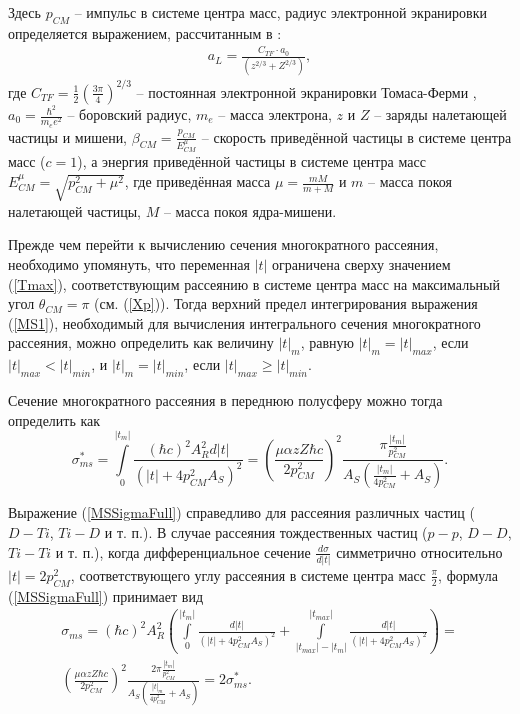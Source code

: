 \documentclass[a4paper,12pt]{article}
\begin{document}
\begin{large}
Здесь $p_{CM}$ -- импульс в системе центра масс, радиус электронной экранировки определяется выражением, рассчитанным в \cite{LinhardScreeningLength}:
\begin{equation}
\label{MSaL}
\begin{aligned} 
a_L=\frac{ C_{TF} \cdot a_0 }{ \left( z^{2/3} + Z^{2/3} \right) },
\end{aligned}
\end{equation} 
где $C_{TF}= \frac{1}{2} \left( \frac{3\pi}{4} \right)^{2/3}$ -- постоянная электронной экранировки Томаса-Ферми \cite{ThomasFermiModel}, $a_0=\frac{ \hbar^2 }{ m_ee^2 }$ -- боровский радиус, $m_e$ -- масса электрона, $z$ и $Z$ -- заряды налетающей частицы и мишени, $\beta_{CM}=\frac{p_{CM}}{E_{CM}^{\mu}}$ -- скорость приведённой частицы в системе центра масс ($c=1$), а энергия приведённой частицы в системе центра масс $E_{CM}^{\mu}=\sqrt{p_{CM}^2+\mu^2}$, где приведённая масса $\mu=\frac{mM}{m+M}$ и $m$ -- масса покоя налетающей частицы, $M$ -- масса покоя ядра-мишени.

Прежде чем перейти к вычислению сечения многократного рассеяния, необходимо упомянуть, что переменная $|t|$ ограничена сверху значением (\ref{Tmax}),
соответствующим рассеянию в системе центра масс на максимальный угол $\theta_{CM}=\pi$ (см. (\ref{Xp})). Тогда верхний предел интегрирования выражения (\ref{MS1}), необходимый для вычисления интегрального сечения многократного рассеяния, можно определить как величину $|t|_m$, равную $|t|_m=|t|_{max}$, если $|t|_{max}<|t|_{min}$, и $|t|_m=|t|_{min}$, если $|t|_{max} \geq |t|_{min}$.

Сечение многократного рассеяния в переднюю полусферу можно тогда определить как
\begin{equation}
\label{MSSigmaFull} 
\sigma^*_{ms}= \int \limits_0^{|t_{m}|} \frac{\left( \hbar c \right)^2 A_R^2 d|t|}{\left( |t| + 4p_{CM}^2 A_S \right)^2} = \left( \frac{\mu \alpha z Z \hbar c }{2p_{CM}^2} \right)^2 \frac{\pi\frac{|t_{m}|}{p_{CM}^2}}{ A_S \left( \frac{|t_{m}|}{4p_{CM}^2} + A_S \right) }.
\end{equation}

Выражение (\ref{MSSigmaFull}) справедливо для рассеяния различных частиц ($D-Ti$, $Ti-D$ и т. п.). В случае рассеяния тождественных частиц ($p-p$, $D-D$, $Ti-Ti$ и т. п.), когда дифференциальное сечение $\frac{d\sigma}{d|t|}$ симметрично относительно $|t|=2p_{CM}^2$, соответствующего углу рассеяния в системе центра масс $\frac{\pi}{2}$, формула (\ref{MSSigmaFull}) принимает вид
\begin{multline}
\label{MSSigmaFullEqual}
\sigma_{ms}= \left( \hbar c \right)^2  A_R^2 \left( \int \limits_0^{|t_{m}|} \frac{d|t|}{\left( |t| + 4p_{CM}^2 A_S \right)^2} + \int \limits_{|t_{max}|-|t_m|}^{|t_{max}|} \frac{d|t|}{\left( |t| + 4p_{CM}^2 A_S \right)^2} \right)= \\ \left( \frac{\mu \alpha z Z \hbar c }{2p_{CM}^2} \right)^2 \frac{2\pi\frac{|t_{m}|}{p_{CM}^2}}{ A_S \left( \frac{|t|_{m}}{4p_{CM}^2} + A_S \right)} = 2 \sigma^*_{ms}.
\end{multline}


\end{large}
\end{document}

